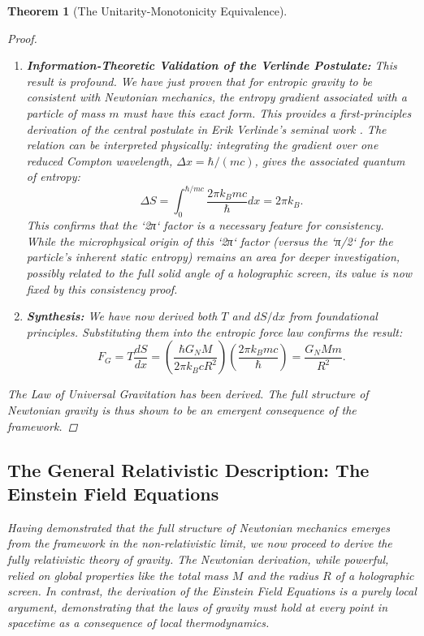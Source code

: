 \documentclass[11pt, letterpaper]{report}
\theoremstyle{plain} %
\newtheorem{theorem}{Theorem}[chapter]
\theoremstyle{definition} %
\theoremstyle{remark} %
\begin{document}
\begin{theorem}[The Unitarity-Monotonicity Equivalence]
\begin{proof}
\begin{enumerate}
    \item \textbf{Information-Theoretic Validation of the Verlinde Postulate:} This result is profound. We have just proven that for entropic gravity to be consistent with Newtonian mechanics, the entropy gradient associated with a particle of mass $m$ \textit{must} have this exact form. This provides a first-principles derivation of the central postulate in Erik Verlinde's seminal work \cite{Verlinde2011}. The relation can be interpreted physically: integrating the gradient over one reduced Compton wavelength, $\Delta x = \hbar/(mc)$, gives the associated quantum of entropy:
    $$ \Delta S = \int_0^{\hbar/mc} \frac{2\pi k_B m c}{\hbar} dx = 2\pi k_B. $$
    This confirms that the `2π` factor is a necessary feature for consistency. While the microphysical origin of this `2π` factor (versus the `π/2` for the particle's inherent static entropy) remains an area for deeper investigation, possibly related to the full solid angle of a holographic screen, its value is now fixed by this consistency proof.

    \item \textbf{Synthesis:} We have now derived both $T$ and $dS/dx$ from foundational principles. Substituting them into the entropic force law confirms the result:
    $$ F_G = T \frac{dS}{dx} = \left( \frac{\hbar G_N M}{2\pi k_B c R^2} \right) \left( \frac{2\pi k_B m c}{\hbar} \right) = \frac{G_N M m}{R^2}. $$
\end{enumerate}
The Law of Universal Gravitation has been derived. The full structure of Newtonian gravity is thus shown to be an emergent consequence of the framework.
\end{proof}

\subsection{The General Relativistic Description: The Einstein Field Equations}
\label{subsec:verify_efe_thermo_revised}

Having demonstrated that the full structure of Newtonian mechanics emerges from the framework in the non-relativistic limit, we now proceed to derive the fully relativistic theory of gravity. The Newtonian derivation, while powerful, relied on global properties like the total mass $M$ and the radius $R$ of a holographic screen. In contrast, the derivation of the Einstein Field Equations is a purely local argument, demonstrating that the laws of gravity must hold at every point in spacetime as a consequence of local thermodynamics.


\end{theorem}
\end{document}
